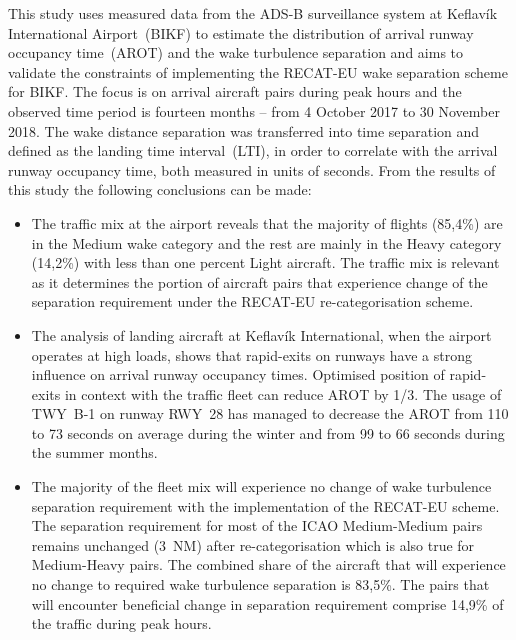 This study uses measured data from the ADS-B surveillance system at Keflavík International Airport~(BIKF) to estimate the distribution of arrival runway occupancy time~(AROT) and the wake turbulence separation and aims to validate the constraints of implementing the RECAT-EU wake  separation scheme for BIKF. The focus is on arrival aircraft pairs during peak hours and the observed time period is fourteen months -- from 4 October 2017 to 30 November 2018. The wake distance separation was transferred into time separation and defined as the landing time interval~(LTI), in order to correlate with the arrival runway occupancy time, both measured in units of seconds.
From the results of this study the following conclusions can be made:
\begin{itemize}

    \item The traffic mix at the airport reveals that the majority of flights (85,4\%) are in the Medium wake category and the rest are mainly in the Heavy category (14,2\%) with less than one percent Light aircraft. The traffic mix is relevant as it determines the portion of aircraft pairs that experience change of the separation requirement under the RECAT-EU re-categorisation scheme.

    \item The analysis of landing aircraft at Keflavík International, when the airport operates at high loads, shows that rapid-exits on runways have a strong influence on arrival runway occupancy times. Optimised position of rapid-exits in context with the traffic fleet can reduce AROT by 1/3. The usage of TWY~B-1 on runway RWY~28 has managed to decrease the AROT from 110 to 73 seconds on average during the winter and from 99 to 66 seconds during the summer months.
    
    \item The majority of the fleet mix will experience no change of wake turbulence separation requirement with the implementation of the RECAT-EU scheme. The separation requirement for most of the ICAO Medium-Medium pairs remains unchanged (3~NM) after re-categorisation which is also true for Medium-Heavy pairs. The combined share of the aircraft that will experience no change to required wake turbulence separation is 83,5\%. The pairs that will encounter beneficial change in separation requirement comprise 14,9\% of the traffic during peak hours.
    

\end{itemize}
